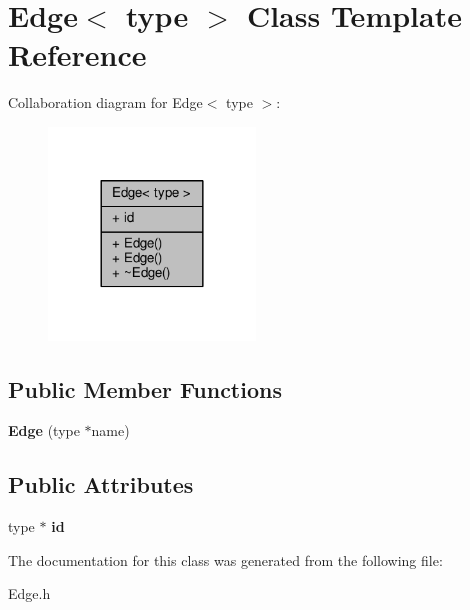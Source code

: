 \hypertarget{class_edge}{\section{Edge$<$ type $>$ Class Template Reference}
\label{class_edge}
}


Collaboration diagram for Edge$<$ type $>$\+:
\nopagebreak
\begin{figure}[H]
\begin{center}
\leavevmode
\includegraphics[width=156pt]{class_edge__coll__graph}
\end{center}
\end{figure}
\subsection*{Public Member Functions}
\begin{DoxyCompactItemize}
\item 
\hypertarget{class_edge_ab43f91be57927f083a0667624f8ce10e}{{\bfseries Edge} (type $\ast$name)}\label{class_edge_ab43f91be57927f083a0667624f8ce10e}

\end{DoxyCompactItemize}
\subsection*{Public Attributes}
\begin{DoxyCompactItemize}
\item 
\hypertarget{class_edge_acc1a8bc0a7119feb91e359fb15fc4a75}{type $\ast$ {\bfseries id}}\label{class_edge_acc1a8bc0a7119feb91e359fb15fc4a75}

\end{DoxyCompactItemize}


The documentation for this class was generated from the following file\+:\begin{DoxyCompactItemize}
\item 
Edge.\+h\end{DoxyCompactItemize}
